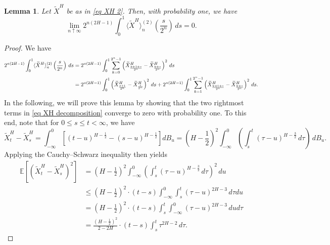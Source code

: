\documentclass[12pt,reqno]{article}
\def\ua{\uparrow}
\def\wt{\widetilde}
\newcommand\scalemath[2]{\scalebox{#1}{\mbox{\ensuremath{\displaystyle #2}}}}
\numberwithin{equation}{section}
\newtheorem{lemma}[theorem]{Lemma}
\theoremstyle{definition}
\def\<{\langle}
\def\>{\rangle}
\def\wt#1{\widetilde{#1}}
\def\ua{\uparrow}
\def\wt{\widetilde}
\newcommand{\bE}{\mathbb{E}}
\begin{document}
\begin{lemma}\label{lemma XH QV}
	Let $\wt X^H$ be as in \eqref{eq XH 2}. Then, with probability one, we have
	\begin{equation*}
		\lim_{n \ua \infty} 2^{n(2H-1)}\int_0^{1}\<\wt X^H\>^{(2)}_n\left(\frac{s}{2^n}\right)\,ds = 0.
	\end{equation*}
\end{lemma}
\begin{proof}
	We have
	\begin{equation}\label{eq XH decomposition}
		\scalemath{0.9}{	\begin{split}
				2^{n(2H-1)}\int_0^{1}\<\wt X^H\>^{(2)}_n\left(\frac{s}{2^n}\right)\,ds &= 2^{n(2H-1)}\int_0^{1}\sum_{k = 0}^{2^n-1}\left(\wt X^H_{\frac{k+1+s}{2^n}} - \wt X^H_{\frac{k+s}{2^n}}\right)^2\,ds\\&= 2^{n(2H-1)}\int_0^{1}\left(\wt X^H_{\frac{s+1}{2^n}} - \wt X^H_{\frac{s}{2^n}}\right)^2\,ds + 2^{n(2H-1)}\int_0^{1}\sum_{k = 1}^{2^n-1}\left(\wt X^H_{\frac{k+1+s}{2^n}} - \wt X^H_{\frac{k+s}{2^n}}\right)^2\,ds.
		\end{split}}
	\end{equation}
	In the following, we will prove this lemma by showing that the two rightmost terms in \eqref{eq XH decomposition} converge to zero with probability one. To this end, note that for $0 \le s \le t < \infty$, we have 
	\begin{equation*}
		\wt X^H_t - \wt X^H_s = \int_{-\infty}^{0}\left[(t-u)^{H - \frac{1}{2}} - (s-u)^{H-\frac{1}{2}}\right]dB_u = \left(H-\frac{1}{2}\right)^2\int_{-\infty}^{0}\left(\int_s^t(\tau - u)^{H-\frac{3}{2}}\,d\tau \right)\,dB_u. 
	\end{equation*}
	Applying the Cauchy--Schwarz inequality then yields 
	\begin{equation}\label{eq XH second moment}
		\begin{split}
			\bE\left[\left(\wt X^H_t - \wt X^H_s\right)^2\right] &= \left(H-\frac{1}{2}\right)^2\int_{-\infty}^0 \left(\int_s^t(\tau - u)^{H-\frac{3}{2}}\,d\tau \right)^2\,du\\&\le \left(H-\frac{1}{2}\right)^2\cdot (t-s)\int_{-\infty}^0 \int_s^t (\tau - u)^{2H-3}\, d\tau du\\&= \left(H-\frac{1}{2}\right)^2\cdot (t-s)\int_s^t\int_{-\infty}^{0} (\tau - u)^{2H-3}\,dud\tau \\&= \frac{\left(H-\frac{1}{2}\right)^2}{2-2H}\cdot (t-s)\int_s^t \tau^{2H-2}\, d\tau.
		\end{split}
	\end{equation}

\end{proof}
\end{document}
